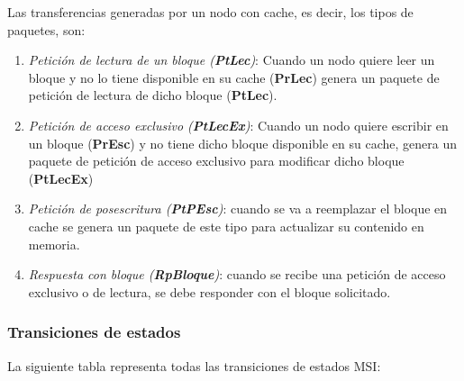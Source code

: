 \documentclass[10pt,a4paper,spanish]{report}
\begin{document}
Las transferencias generadas por un nodo con cache, es decir, los tipos de paquetes, son:
\begin{enumerate}[\color{azul}{\bf $\heartsuit$}]
    \item \textcolor[rgb]{0.2,0.4,0.8}{\textit{Petición de lectura de un bloque (\textbf{PtLec})}}: Cuando un nodo quiere leer un bloque y no lo tiene disponible en su cache (\textcolor[rgb]{0.2,0.4,0.8}{\textbf{PrLec}}) genera un paquete de petición de lectura de dicho bloque (\textcolor[rgb]{0.2,0.4,0.8}{\textbf{PtLec}}).

    \item \textcolor[rgb]{0.2,0.4,0.8}{\textit{Petición de acceso exclusivo (\textbf{PtLecEx})}}: Cuando un nodo quiere escribir en un bloque (\textcolor[rgb]{0.2,0.4,0.8}{\textbf{PrEsc}}) y no tiene dicho bloque disponible en su cache, genera un paquete de petición de acceso exclusivo para modificar dicho bloque (\textbf{\textcolor[rgb]{0.2,0.4,0.8}{PtLecEx}})

    \item \textcolor[rgb]{0.2,0.4,0.8}{\textit{Petición de posescritura (\textbf{PtPEsc})}}: cuando se va a reemplazar el bloque en cache se genera un paquete de este tipo para actualizar su contenido en memoria.

    \item \textcolor[rgb]{0.2,0.4,0.8}{\textit{Respuesta con bloque (\textbf{RpBloque})}}: cuando se recibe una petición de acceso exclusivo o de lectura, se debe responder con el bloque solicitado. 
\end{enumerate}

\textcolor[rgb]{0.2,0.4,0.8}{\subsubsection{Transiciones de estados}}
\label{trans_msi}
La siguiente tabla representa todas las transiciones de estados MSI:
\end{document}
